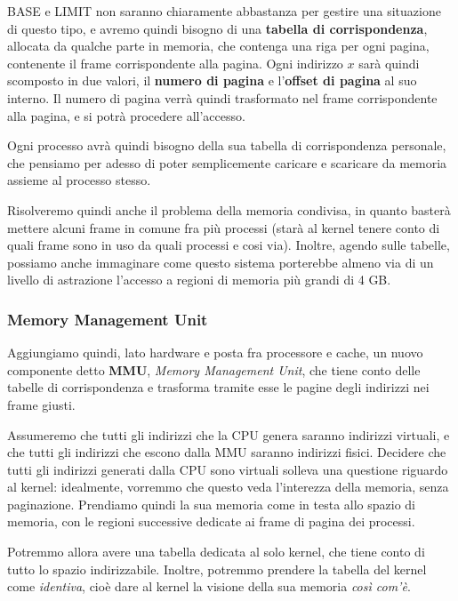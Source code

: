 \documentclass[a4paper,11pt]{article}
\begin{document}
BASE e LIMIT non saranno chiaramente abbastanza per gestire una situazione di questo tipo, e avremo quindi bisogno di una \textbf{tabella di corrispondenza}, allocata da qualche parte in memoria, che contenga una riga per ogni pagina, contenente il frame corrispondente alla pagina.
Ogni indirizzo $x$ sarà quindi scomposto in due valori, il \textbf{numero di pagina} e l'\textbf{offset di pagina} al suo interno.
Il numero di pagina verrà quindi trasformato nel frame corrispondente alla pagina, e si potrà procedere all'accesso.

Ogni processo avrà quindi bisogno della sua tabella di corrispondenza personale, che pensiamo per adesso di poter semplicemente caricare e scaricare da memoria assieme al processo stesso.

Risolveremo quindi anche il problema della memoria condivisa, in quanto basterà mettere alcuni frame in comune fra più processi (starà al kernel tenere conto di quali frame sono in uso da quali processi e cosi via).
Inoltre, agendo sulle tabelle, possiamo anche immaginare come questo sistema porterebbe almeno via di un livello di astrazione l'accesso a regioni di memoria più grandi di 4 GB.

\subsubsection{Memory Management Unit}
Aggiungiamo quindi, lato hardware e posta fra processore e cache, un nuovo componente detto \textbf{MMU}, \textit{Memory Management Unit}, che tiene conto delle tabelle di corrispondenza e trasforma tramite esse le pagine degli indirizzi nei frame giusti.

Assumeremo che tutti gli indirizzi che la CPU genera saranno indirizzi virtuali, e che tutti gli indirizzi che escono dalla MMU saranno indirizzi fisici.
Decidere che tutti gli indirizzi generati dalla CPU sono virtuali solleva una questione riguardo al kernel: idealmente, vorremmo che questo veda l'interezza della memoria, senza paginazione.
Prendiamo quindi la sua memoria come in testa allo spazio di memoria, con le regioni successive dedicate ai frame di pagina dei processi.

Potremmo allora avere una tabella dedicata al solo kernel, che tiene conto di tutto lo spazio indirizzabile.
Inoltre, potremmo prendere la tabella del kernel come \textit{identiva}, cioè dare al kernel la visione della sua memoria \textit{così com'è}.
\end{document}
